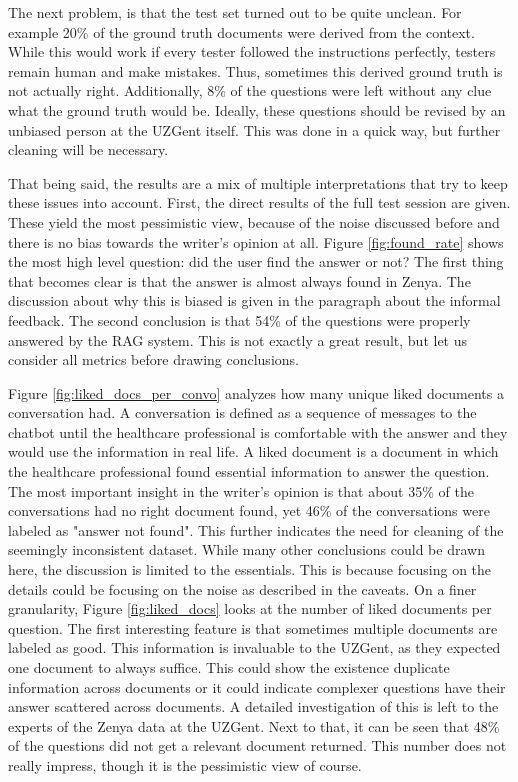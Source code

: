 The next problem, is that the test set turned out to be quite unclean. For example 20\% of the ground truth documents were derived from the context. While this would work if every tester followed the instructions perfectly, testers remain human and make mistakes. Thus, sometimes this derived ground truth is not actually right. Additionally, 8\% of the questions were left without any clue what the ground truth would be. Ideally, these questions should be revised by an unbiased person at the UZGent itself. This was done in a quick way, but further cleaning will be necessary.

That being said, the results are a mix of multiple interpretations that try to keep these issues into account. First, the direct results of the full test session are given. These yield the most pessimistic view, because of the noise discussed before and there is no bias towards the writer's opinion at all. Figure \ref{fig:found_rate} shows the most high level question: did the user find the answer or not? The first thing that becomes clear is that the answer is almost always found in Zenya. The discussion about why this is biased is given in the paragraph about the informal feedback. The second conclusion is that 54\% of the questions were properly answered by the RAG system. This is not exactly a great result, but let us consider all metrics before drawing conclusions. 

Figure \ref{fig:liked_docs_per_convo} analyzes how many unique liked documents a conversation had. A conversation is defined as a sequence of messages to the chatbot until the healthcare professional is comfortable with the answer and they would use the information in real life. A liked document is a document in which the healthcare professional found essential information to answer the question. The most important insight in the writer's opinion is that about 35\% of the conversations had no right document found, yet 46\% of the conversations were labeled as "answer not found". This further indicates the need for cleaning of the seemingly inconsistent dataset. While many other conclusions could be drawn here, the discussion is limited to the essentials. This is because focusing on the details could be focusing on the noise as described in the caveats. On a finer granularity, Figure \ref{fig:liked_docs} looks at the number of liked documents per question. The first interesting feature is that sometimes multiple documents are labeled as good. This information is invaluable to the UZGent, as they expected one document to always suffice. This could show the existence duplicate information across documents or it could indicate complexer questions have their answer scattered across documents. A detailed investigation of this is left to the experts of the Zenya data at the UZGent. Next to that, it can be seen that 48\% of the questions did not get a relevant document returned. This number does not really impress, though it is the pessimistic view of course.

